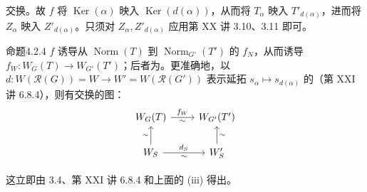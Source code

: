 交换。故 $f$ 将 $\operatorname{Ker}(\alpha)$ 映入 $\operatorname{Ker}(d(\alpha))$，从而将 $T_\alpha$ 映入 $T'_{d(\alpha)}$，进而将 $Z_\alpha$ 映入 $Z'_{d(\alpha)}$。只须对 $Z_\alpha,Z'_{d(\alpha)}$ 应用第 XX 讲 3.10、3.11 即可。
\begin{SGAresult}{命题}{4.2.4}  $f$ 诱导从 $\operatorname{Norm}(T)$ 到 $\operatorname{Norm}_{G'}(T')$ 的 $f_N$，从而诱导 $f_W:W_G(T)\to W_{G'}(T')$；后者为。更准确地，以 $d:W(\mathcal R(G))=W\to W'=W(\mathcal R(G'))$ 表示延拓 $s_\alpha\mapsto s_{d(\alpha)}$ 的（第 XXI 讲 6.8.4），则有交换的图：
\[\begin{tikzcd}W_G(T)\arrow[r,"f_W","\sim"']&W_{G'}(T')\\W_S\arrow[u,"\sim"]\arrow[r,"d_S","\sim"']&W'_S\arrow[u,"\sim"']\end{tikzcd}\]
\end{SGAresult}
这立即由 3.4、第 XXI 讲 6.8.4 和上面的 (iii) 得出。

